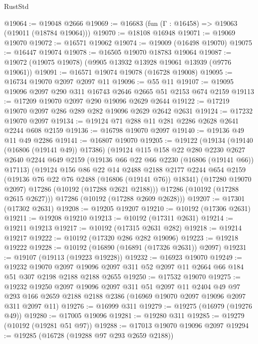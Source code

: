 \begin{lexlean}{RustStd}
\begin{coremodule}
@19064 := @19048 @2666
@19069 := @16683 (fun (Γ : @16458) => @19063 (@19011 (@18784 @19064)))
@19070 := @18108 @16948
@19071 := @19069 @19070
@19072 := @16571 @19062
@19074 := @19009 (@16498 @19070)
@19075 := @16447 @19074
@19078 := @16505 @19070 @18783 @19064
@19087 := @19072 (@19075 @19078) (@9905 @13932 @13928 @19061 @13939 (@9776 @19061))
@19091 := @16571 @19074 @19078 (@16728 @19008)
@19095 := @16734 @19070 @2097 @2097 @11
@19096 := @55 @11
@19107 := @19095 @19096 @2097 @290 @311 @16743 @2646 @2665 @51 @2153 @674 @2159
@19113 := @17209 @19070 @2097 @290 @19096 @2629 @2644
@19122 := @17219 @19070 @2097 @286 @289 @282 @19096 @2629 @2642 @2631
@19124 := @17232 @19070 @2097
@19134 := @19124 @71 @288 @11 @281 @2286 @2628 @2641 @2244 @608 @2159
@19136 := @16798 @19070 @2097
@19140 := @19136 @49 @11 @49 @2286
@19141 := @16807 @19070
@19205 := @19122
    (@19134
      (@19140 (@16806 (@19141 @49)) @17386)
      (@19124
        @115
        @158
        @22
        @280
        @2230
        @2627
        @2640
        @2244
        @649
        @2159
        (@19136 @66 @22 @66 @2230 (@16806 (@19141 @66)) @17113)
        (@19124
          @156
          @86
          @22
          @14
          @2488
          @2188
          @2177
          @2244
          @654
          @2159
          (@19136 @76 @22 @76 @2488 (@16806 (@19141 @76)) @18341)
          (@17280 @19070 @2097)
          @17286
          (@10192 (@17288 @2621 @2188)))
        @17286
        (@10192 (@17288 @2615 @2627)))
      @17286
      (@10192 (@17288 @2609 @2628)))
@19207 := @17301 (@17302 @2631)
@19208 := @19205 @19207
@19210 := @10192 (@17306 @2631)
@19211 := @19208 @19210
@19213 := @10192 (@17311 @2631)
@19214 := @19211 @19213
@19217 := @10192 (@17315 @2631 @282)
@19218 := @19214 @19217
@19222 := @10192 (@17320 @286 @282 @19096)
@19223 := @19218 @19222
@19228 := @10192 (@16890 (@16891 (@17326 @2631)) @2097)
@19231 := @19107 (@19113 (@19223 @19228))
@19232 := @16923 @19070
@19249 := @19232
    @19070
    @2097
    @19096
    @2097
    @311
    @52
    @2097
    @11
    @2664
    @66
    @184
    @51
    @307
    @2198
    @2188
    @2188
    @2655
@19250 := @17532 @19070
@19275 := @19232
    @19250
    @2097
    @19096
    @2097
    @311
    @51
    @2097
    @11
    @2404
    @49
    @97
    @293
    @166
    @2659
    @2188
    @2188
    @2386
    (@16969 @19070 @2097 @19096 @2097 @311 @2097 @11)
@19276 := @16999 @311
@19279 := @19275 (@16979 (@19276 @49))
@19280 := @17005 @19096
@19281 := @19280 @311
@19285 := @19279 (@10192 (@19281 @51 @97))
@19288 := @17013 @19070 @19096 @2097
@19294 := @19285 (@16728 (@19288 @97 @293 @2659 @2188))

\end{coremodule}
\end{lexlean}
